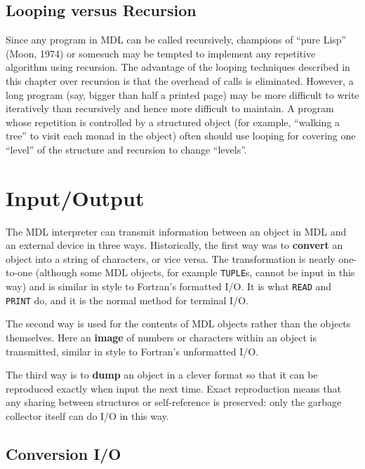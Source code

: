 \documentclass[a4paper]{scrbook}
\begin{document}
\section{Looping versus Recursion}\label{looping-versus-recursion}

Since any program in MDL can be called recursively, champions of ``pure Lisp'' (Moon, 1974) or somesuch may be tempted to
implement any repetitive algorithm using recursion. The advantage of the looping techniques described in this chapter over
recursion is that the overhead of calls is eliminated. However, a long program (say, bigger than half a printed page) may
be more difficult to write iteratively than recursively and hence more difficult to maintain. A program whose repetition is
controlled by a structured object (for example, ``walking a tree'' to visit each monad in the object) often should use
looping for covering one ``level'' of the structure and recursion to change ``levels''.

\chapter{Input/Output}\label{chapter-11.-inputoutput}

The MDL interpreter can transmit information between an object in MDL and an external device in three ways. Historically,
the first way was to \textbf{convert} an object into a string of characters, or vice versa. The transformation is nearly
one-to-one (although some MDL objects, for example \texttt{TUPLE}s, cannot be input in this way) and is similar in style to
Fortran's formatted I/O. It is what \texttt{READ} and \texttt{PRINT} do, and it is the normal method for terminal I/O.

The second way is used for the contents of MDL objects rather than the objects themselves. Here an \textbf{image} of
numbers or characters within an object is transmitted, similar in style to Fortran's unformatted I/O.

The third way is to \textbf{dump} an object in a clever format so that it can be reproduced exactly when input the next
time. Exact reproduction means that any sharing between structures or self-reference is preserved: only the garbage
collector itself can do I/O in this way.

\section{Conversion I/O}\label{conversion-io}
\end{document}
